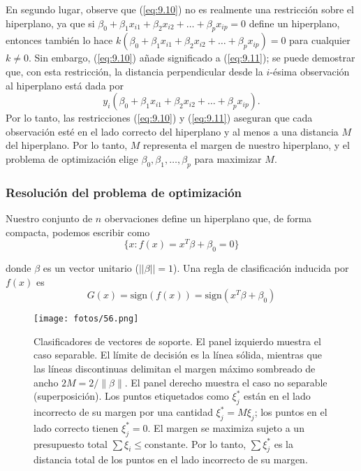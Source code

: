 En segundo lugar, observe que (\ref{eq:9.10}) no es realmente una restricción sobre el hiperplano, ya que si $\beta_0 + \beta_1 x_{i1} + \beta_2 x_{i2} + \ldots + \beta_p x_{ip} = 0$ define un hiperplano, entonces también lo hace $k (\beta_0 + \beta_1 x_{i1} + \beta_2 x_{i2} + \ldots + \beta_p x_{ip}) = 0$ para cualquier $k \neq 0$. Sin embargo, (\ref{eq:9.10}) añade significado a (\ref{eq:9.11}); se puede demostrar que, con esta restricción, la distancia perpendicular desde la $i$-ésima observación al hiperplano está dada por
\begin{equation}
y_i (\beta_0 + \beta_1 x_{i1} + \beta_2 x_{i2} + \ldots + \beta_p x_{ip}).
\end{equation}
Por lo tanto, las restricciones (\ref{eq:9.10}) y (\ref{eq:9.11}) aseguran que cada observación esté en el lado correcto del hiperplano y al menos a una distancia $M$ del hiperplano. Por lo tanto, $M$ representa el margen de nuestro hiperplano, y el problema de optimización elige $\beta_0, \beta_1, \ldots, \beta_p$ para maximizar $M$. 

\subsubsection{Resolución del problema de optimización}

Nuestro conjunto de $n$ obervaciones define un hiperplano que, de forma compacta, podemos escribir como 
\begin{equation}
\{x: f(x) = x^T \beta + \beta_0 = 0\}
\end{equation}

\noindent donde $\beta$ es un vector unitario ($||\beta|| = 1$). Una regla de clasificación inducida por $f(x)$ es 
\begin{equation}
G(x) = \text{sign}(f(x)) = \text{sign}(x^T \beta + \beta_0)
\end{equation}

\begin{figure}[h]
\centering
\texttt{[image: fotos/56.png]}
\caption{Clasificadores de vectores de soporte. El panel izquierdo muestra el caso separable. El límite de decisión es la línea sólida, mientras que las líneas discontinuas delimitan el margen máximo sombreado de ancho $2M = 2/\|\beta\|$. El panel derecho muestra el caso no separable (superposición). Los puntos etiquetados como $\xi^*_j$ están en el lado incorrecto de su margen por una cantidad $\xi^*_j = M \xi_j$; los puntos en el lado correcto tienen $\xi^*_j = 0$. El margen se maximiza sujeto a un presupuesto total $\sum \xi_i \leq \text{constante}$. Por lo tanto, $\sum \xi^*_j$ es la distancia total de los puntos en el lado incorrecto de su margen.}
\label{fig:12.1}
\end{figure}

